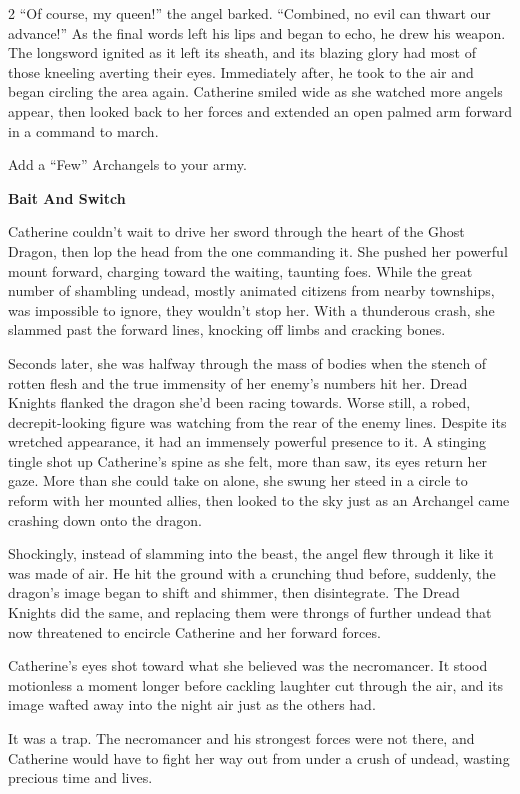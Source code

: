 \begin{multicols*}{2}
``Of course, my queen!'' the angel barked.
``Combined, no evil can thwart our advance!'' As the final words left his lips and began to echo, he drew his weapon.
The longsword ignited as it left its sheath, and its blazing glory had most of those kneeling averting their eyes.
Immediately after, he took to the air and began circling the area again.
Catherine smiled wide as she watched more angels appear, then looked back to her forces and extended an open palmed arm forward in a command to march.

\textcolor{darkcandyapplered}{Add a ``Few'' Archangels to your army.}

\textbf{Bait And Switch}

Catherine couldn't wait to drive her sword through the heart of the Ghost Dragon, then lop the head from the one commanding it.
She pushed her powerful mount forward, charging toward the waiting, taunting foes.
While the great number of shambling undead, mostly animated citizens from nearby townships, was impossible to ignore, they wouldn't stop her.
With a thunderous crash, she slammed past the forward lines, knocking off limbs and cracking bones.

Seconds later, she was halfway through the mass of bodies when the stench of rotten flesh and the true immensity of her enemy's numbers hit her.
Dread Knights flanked the dragon she'd been racing towards.
Worse still, a robed, decrepit-looking figure was watching from the rear of the enemy lines.
Despite its wretched appearance, it had an immensely powerful presence to it.
A stinging tingle shot up Catherine's spine as she felt, more than saw, its eyes return her gaze.
More than she could take on alone, she swung her steed in a circle to reform with her mounted allies, then looked to the sky just as an Archangel came crashing down onto the dragon.

Shockingly, instead of slamming into the beast, the angel flew through it like it was made of air.
He hit the ground with a crunching thud before, suddenly, the dragon's image began to shift and shimmer, then disintegrate.
The Dread Knights did the same, and replacing them were throngs of further undead that now threatened to encircle Catherine and her forward forces.

Catherine's eyes shot toward what she believed was the necromancer.
It stood motionless a moment longer before cackling laughter cut through the air, and its image wafted away into the night air just as the others had.

It was a trap.
The necromancer and his strongest forces were not there, and Catherine would have to fight her way out from under a crush of undead, wasting precious time and lives.


\end{multicols*}
